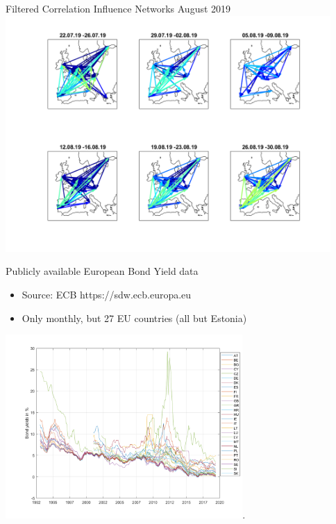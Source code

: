 \documentclass{beamer}
\begin{document}
\begin{frame}{Filtered Correlation Influence Networks August 2019}
\vspace{-0.00cm}\hspace*{-1cm}\includegraphics[height=9cm]{networks30-08-2019}


\end{frame}





\begin{frame}{Publicly available European Bond Yield data}
\begin{itemize}
	\item Source: ECB https://sdw.ecb.europa.eu
	\item Only monthly, but 27 EU countries (all but Estonia)
\end{itemize}
\includegraphics[height=7cm]{yields-monthly}.

\end{frame}
\end{document}
